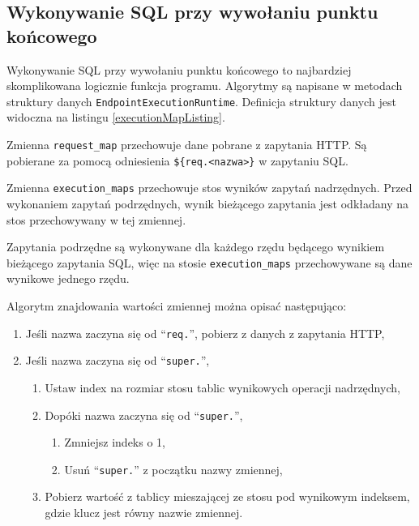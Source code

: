 \subsection{Wykonywanie SQL przy wywołaniu punktu końcowego}

Wykonywanie SQL przy wywołaniu punktu końcowego to najbardziej skomplikowana
logicznie funkcja programu. Algorytmy są napisane w metodach struktury danych
\verb|EndpointExecutionRuntime|. Definicja struktury danych jest widoczna na
listingu \ref{executionMapListing}. 

Zmienna \verb|request_map| przechowuje dane pobrane z zapytania HTTP. Są
pobierane za pomocą odniesienia \verb|${req.<nazwa>}| w zapytaniu SQL.

Zmienna \verb|execution_maps| przechowuje stos wyników zapytań nadrzędnych.
Przed wykonaniem zapytań podrzędnych, wynik bieżącego zapytania jest odkładany
na stos przechowywany w tej zmiennej.

Zapytania podrzędne są wykonywane dla każdego rzędu będącego wynikiem bieżącego
zapytania SQL, więc na stosie \verb|execution_maps| przechowywane są dane
wynikowe jednego rzędu.



Algorytm znajdowania wartości zmiennej można opisać następująco:

\begin{enumerate}

    \item Jeśli nazwa zaczyna się od ``\verb|req.|'', pobierz z danych z zapytania HTTP,

    \item Jeśli nazwa zaczyna się od ``\verb|super.|'',

        \begin{enumerate}

            \item Ustaw index na rozmiar stosu tablic wynikowych operacji nadrzędnych,

            \item Dopóki nazwa zaczyna się od ``\verb|super.|'',

                \begin{enumerate}

                    \item Zmniejsz indeks o 1,

                    \item Usuń ``\verb|super.|'' z początku nazwy zmiennej,

                \end{enumerate}

            \item Pobierz wartość z tablicy mieszającej ze stosu pod wynikowym
                indeksem, gdzie klucz jest równy nazwie zmiennej.

        \end{enumerate}

\end{enumerate}

